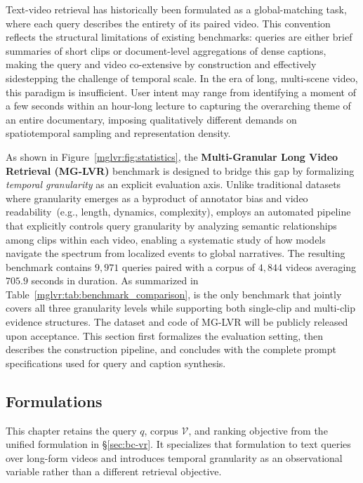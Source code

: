 Text-video retrieval has historically been formulated as a global-matching task, where each query describes the entirety of its paired video. This convention reflects the structural limitations of existing benchmarks: queries are either brief summaries of short clips or document-level aggregations of dense captions, making the query and video co-extensive by construction and effectively sidestepping the challenge of temporal scale. In the era of long, multi-scene video, this paradigm is insufficient. User intent may range from identifying a moment of a few seconds within an hour-long lecture to capturing the overarching theme of an entire documentary, imposing qualitatively different demands on spatiotemporal sampling and representation density.

As shown in Figure~\ref{mglvr:fig:statistics}, the \textbf{Multi-Granular Long Video Retrieval (MG-LVR)} benchmark is designed to bridge this gap by formalizing \textit{temporal granularity} as an explicit evaluation axis. Unlike traditional datasets~\cite{lei2020tvr,krishna2017dense} where granularity emerges as a byproduct of annotator bias and video readability~(e.g., length, dynamics, complexity), \benchmarkname employs an automated pipeline that explicitly controls query granularity by analyzing semantic relationships among clips within each video, enabling a systematic study of how models navigate the spectrum from localized events to global narratives. The resulting benchmark contains $9,971$ queries paired with a corpus of $4,844$ videos averaging $705.9$ seconds in duration. As summarized in Table~\ref{mglvr:tab:benchmark_comparison}, \benchmarkname is the only benchmark that jointly covers all three granularity levels while supporting both single-clip and multi-clip evidence structures. The dataset and code of MG-LVR will be publicly released upon acceptance. This section first formalizes the evaluation setting, then describes the construction pipeline, and concludes with the complete prompt specifications used for query and caption synthesis.

\subsection{Formulations}
\label{mglvr:sec:formulation}

This chapter retains the query $q$, corpus $\mathcal{V}$, and ranking objective from the unified formulation in \S\ref{sec:bc-vr}. It specializes that formulation to text queries over long-form videos and introduces temporal granularity as an observational variable rather than a different retrieval objective.

